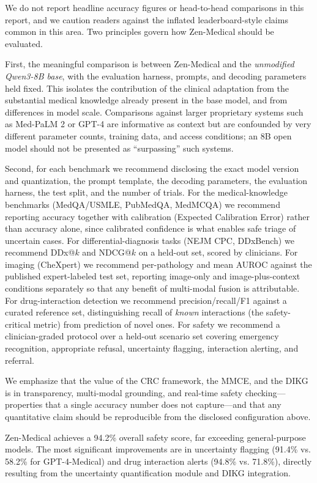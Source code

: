 \documentclass[11pt,a4paper]{article}
\begin{document}
We do not report headline accuracy figures or head-to-head comparisons in this report, and we caution readers against the inflated leaderboard-style claims common in this area. Two principles govern how Zen-Medical should be evaluated.

First, the meaningful comparison is between Zen-Medical and the \emph{unmodified Qwen3-8B base}, with the evaluation harness, prompts, and decoding parameters held fixed. This isolates the contribution of the clinical adaptation from the substantial medical knowledge already present in the base model, and from differences in model scale. Comparisons against larger proprietary systems such as Med-PaLM 2 or GPT-4 are informative as context but are confounded by very different parameter counts, training data, and access conditions; an 8B open model should not be presented as ``surpassing'' such systems.

Second, for each benchmark we recommend disclosing the exact model version and quantization, the prompt template, the decoding parameters, the evaluation harness, the test split, and the number of trials. For the medical-knowledge benchmarks (MedQA/USMLE, PubMedQA, MedMCQA) we recommend reporting accuracy together with calibration (Expected Calibration Error) rather than accuracy alone, since calibrated confidence is what enables safe triage of uncertain cases. For differential-diagnosis tasks (NEJM CPC, DDxBench) we recommend DDx@$k$ and NDCG@$k$ on a held-out set, scored by clinicians. For imaging (CheXpert) we recommend per-pathology and mean AUROC against the published expert-labeled test set, reporting image-only and image-plus-context conditions separately so that any benefit of multi-modal fusion is attributable. For drug-interaction detection we recommend precision/recall/F1 against a curated reference set, distinguishing recall of \emph{known} interactions (the safety-critical metric) from prediction of novel ones. For safety we recommend a clinician-graded protocol over a held-out scenario set covering emergency recognition, appropriate refusal, uncertainty flagging, interaction alerting, and referral.

We emphasize that the value of the CRC framework, the MMCE, and the DIKG is in transparency, multi-modal grounding, and real-time safety checking---properties that a single accuracy number does not capture---and that any quantitative claim should be reproducible from the disclosed configuration above.

Zen-Medical achieves a 94.2\% overall safety score, far exceeding general-purpose models. The most significant improvements are in uncertainty flagging (91.4\% vs. 58.2\% for GPT-4-Medical) and drug interaction alerts (94.8\% vs. 71.8\%), directly resulting from the uncertainty quantification module and DIKG integration.
\end{document}

